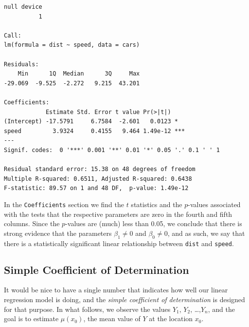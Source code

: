 \documentclass[captions=tableheading]{scrbook}
\begin{document}
\begin{verbatim}
null device 
          1
 
Call:
lm(formula = dist ~ speed, data = cars)

Residuals:
    Min      1Q  Median      3Q     Max 
-29.069  -9.525  -2.272   9.215  43.201 

Coefficients:
            Estimate Std. Error t value Pr(>|t|)    
(Intercept) -17.5791     6.7584  -2.601   0.0123 *  
speed         3.9324     0.4155   9.464 1.49e-12 ***
---
Signif. codes:  0 '***' 0.001 '**' 0.01 '*' 0.05 '.' 0.1 ' ' 1 

Residual standard error: 15.38 on 48 degrees of freedom
Multiple R-squared: 0.6511,	Adjusted R-squared: 0.6438 
F-statistic: 89.57 on 1 and 48 DF,  p-value: 1.49e-12
\end{verbatim}

In the \texttt{Coefficients} section we find the \(t\) statistics and the \(p\)-values associated with the tests that the respective parameters are zero in the fourth and fifth columns. Since the \(p\)-values are (much) less than 0.05, we conclude that there is strong evidence that the parameters \(\beta_{1}\neq0\) and \(\beta_{0}\neq0\), and as such, we say that there is a statistically significant linear relationship between \texttt{dist} and \texttt{speed}. 
\subsection{Simple Coefficient of Determination}
\label{sec-11-3-2}


It would be nice to have a single number that indicates how well our linear regression model is doing, and the \emph{simple coefficient of determination} is designed for that purpose. In what follows, we observe the values \(Y_{1}\), \(Y_{2}\), \ldots{},\(Y_{n}\), and the goal is to estimate \(\mu(x_{0})\), the mean value of \(Y\) at the location \(x_{0}\). 
\end{document}
